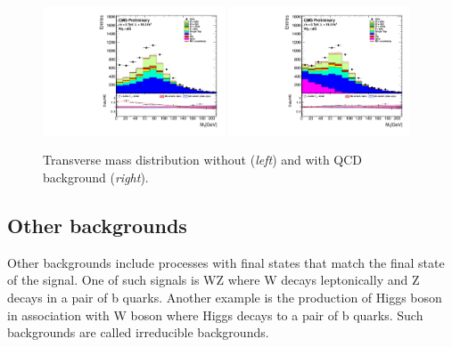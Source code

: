 \begin{figure}[htbp]
	\centering
		\includegraphics[width=0.48\textwidth]{Figures/VMt_QCD_before.pdf}
		\includegraphics[width=0.48\textwidth]{Figures/VMt_QCD_after.pdf}		
	\caption[Transverse mass distribution before and after QCD distribution determination.]{Transverse mass distribution without (\textit{left}) and with QCD background (\textit{right}).}
	\label{fig:QCD_dist}
\end{figure} 


\subsection{Other backgrounds}
Other backgrounds include processes with final states that match the final state of the signal. One of such signals is WZ where W decays leptonically and Z decays in a pair of b quarks. Another example is the production of Higgs boson in association with W boson where Higgs  decays to a pair of b quarks. Such backgrounds are called irreducible backgrounds.


